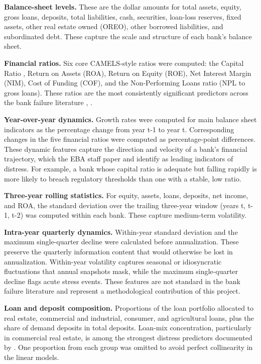 \documentclass[conference]{IEEEtran}
\begin{document}
\textbf{Balance-sheet levels.} These are the dollar amounts for total assets, equity, gross loans, deposits, total liabilities, cash, securities, loan-loss reserves, fixed assets, other real estate owned (OREO), other borrowed liabilities, and subordinated debt. These capture the scale and structure of each bank's balance sheet. 

\textbf{Financial ratios.} Six core CAMELS-style ratios were computed: the Capital Ratio , Return on Assets (ROA), Return on Equity (ROE), Net Interest Margin (NIM), Cost of Funding (COF), and the Non-Performing Loans ratio (NPL to gross loans). These ratios are the most consistently significant predictors across the bank failure literature \cite{b1}, \cite{b4}.

\textbf{Year-over-year dynamics.} Growth rates were computed for main balance sheet indicators as the percentage change from year t-1 to year t. Corresponding changes in the five financial ratios were computed as percentage-point differences. These dynamic features capture the direction and velocity of a bank's financial trajectory, which the EBA staff paper \cite{b3} and \cite{b4} identify as leading indicators of distress. For example, a bank whose capital ratio is adequate but falling rapidly is more likely to breach regulatory thresholds than one with a stable, low ratio.

\textbf{Three-year rolling statistics.} For equity, assets, loans, deposits, net income, and ROA, the standard deviation over the trailing three-year window (years t, t-1, t-2) was computed within each bank. These capture medium-term volatility. 

\textbf{Intra-year quarterly dynamics.} Within-year standard deviation and the maximum single-quarter decline were calculated before annualization. These preserve the quarterly information content that would otherwise be lost in annualization. Within-year volatility captures seasonal or idiosyncratic fluctuations that annual snapshots mask, while the maximum single-quarter decline flags acute stress events. These features are not standard in the bank failure literature and represent a methodological contribution of this project.

\textbf{Loan and deposit composition.} Proportions of the loan portfolio allocated to real estate, commercial and industrial, consumer, and agricultural loans, plus the share of demand deposits in total deposits. Loan-mix concentration, particularly in commercial real estate, is among the strongest distress predictors documented by \cite{b8}. One proportion from each group was omitted to avoid perfect collinearity in the linear models.
\end{document}
